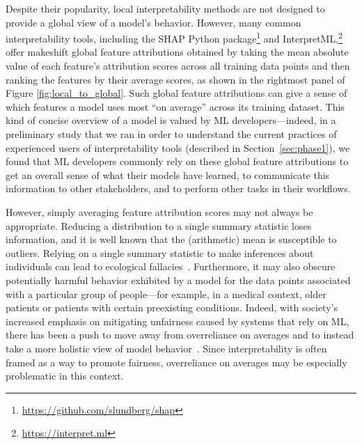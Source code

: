 \documentclass[11pt,dvipdfmx]{article}
\begin{document}
Despite their popularity, local interpretability methods are not
designed to provide a global view of a model's behavior. However, many
common interpretability tools, including the SHAP Python
package\footnote{\url{https://github.com/slundberg/shap}} and
InterpretML,\footnote{\url{https://interpret.ml}} offer makeshift
global feature attributions obtained by taking the mean absolute value
of each feature's attribution scores across all training data points
and then ranking the features by their average scores, as shown in the
rightmost panel of Figure \ref{fig:local_to_global}. Such global
feature attributions can give a sense of which features a model uses
most ``on average'' across its training dataset. This kind of concise
overview of a model is valued by ML developers---indeed, in a
preliminary study that we ran in order to understand the current
practices of experienced users of interpretability tools (described in
Section~\ref{sec:phase1}), we found that ML developers commonly rely
on these global feature attributions to get an overall sense of what
their models have learned, to communicate this information to other
stakeholders, and to perform other tasks in their workflows.

However, simply averaging feature attribution scores may not
always be appropriate. Reducing a distribution to a single summary
statistic loses information, and it is well known that the
(arithmetic) mean is susceptible to outliers. Relying on a single
summary statistic to make inferences about individuals can lead to
ecological fallacies~\citep{R50}. Furthermore, it may also obscure
potentially harmful behavior exhibited by a model for the data points
associated with a particular group of people---for example, in a
medical context, older patients or patients with certain preexisting
conditions. Indeed, with society's increased emphasis on mitigating
unfairness caused by systems that rely on ML, there has been a push to
move away from overreliance on averages and to instead take a more
holistic view of model behavior~\citep[e.g.,][]{Nushi2018,BG+21}.
Since interpretability is often framed as a way to promote fairness,
overreliance on averages may be especially problematic in this
context.
\end{document}
